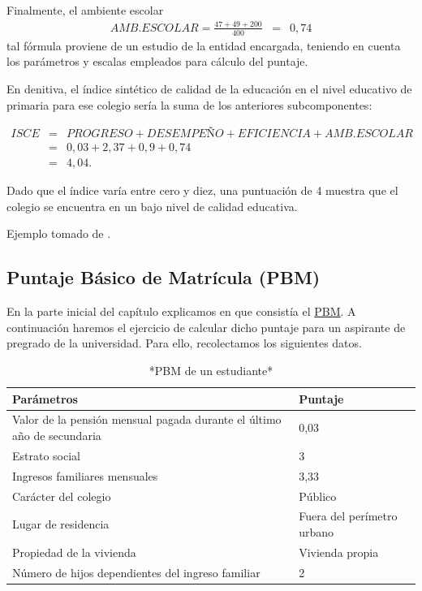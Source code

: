 \documentclass[
]{book}
\begin{document}
Finalmente, el ambiente escolar
\[\begin{eqnarray}
AMB.ESCOLAR= \frac{47+49+200}{400}
&=& 0,74
\end{eqnarray}\]
tal fórmula proviene de un estudio de la entidad encargada, teniendo en cuenta los parámetros y escalas empleados para cálculo del puntaje.

En denitiva, el índice sintético de calidad de la educación en el nivel educativo de primaria para ese colegio sería la suma de los anteriores subcomponentes:

\[\begin{eqnarray}
ISCE&=&PROGRESO+DESEMPEÑO+EFICIENCIA+AMB.ESCOLAR\\&=& 0,03+2,37+0,9+0,74\\&=&4,04.
\end{eqnarray}\]

Dado que el índice varía entre cero y diez, una puntuación de 4 muestra que el colegio se encuentra en un bajo nivel de calidad educativa.

Ejemplo tomado de \citet{lora2008tecnicas}.

\hypertarget{puntaje-buxe1sico-de-matruxedcula-pbm}{%
\subsection{Puntaje Básico de Matrícula (PBM)}\label{puntaje-buxe1sico-de-matruxedcula-pbm}}

En la parte inicial del capítulo explicamos en que consistía el \protect\hyperlink{pbm}{PBM}. A continuación haremos el ejercicio de calcular dicho puntaje para un aspirante de pregrado de la universidad. Para ello, recolectamos los siguientes datos.

\begin{table}

\caption{\label{tab:unnamed-chunk-13}*PBM de un estudiante*}
\centering
\begin{tabular}[t]{l|l}
\hline
Parámetros & Puntaje\\
\hline
Valor de la pensión mensual pagada durante el último año de secundaria & 0,03\\
\hline
Estrato social & 3\\
\hline
Ingresos familiares mensuales & 3,33\\
\hline
Carácter del colegio & Público\\
\hline
Lugar de residencia & Fuera del perímetro urbano\\
\hline
Propiedad de la vivienda & Vivienda propia\\
\hline
Número de hijos dependientes del ingreso familiar & 2\\
\hline
\end{tabular}
\end{table}
\end{document}
